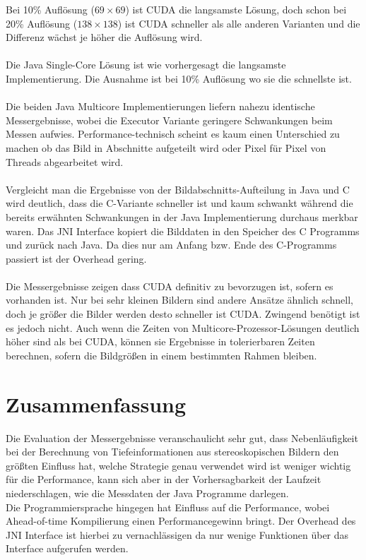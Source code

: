 \documentclass[%
  a4paper,%
  12pt,%
  style=screen, %
  oneside,
  blue,%
  ]{tubsartcl}
\begin{document}
Bei 10\% Auflösung ($69\times69$) ist CUDA die langsamste Lösung, doch schon bei 20\% Auflösung \sloppy ($138\times138$)
ist CUDA schneller als alle anderen Varianten und die Differenz wächst je höher die Auflösung wird.\\
\\
Die Java Single-Core Lösung ist wie vorhergesagt die langsamste Implementierung. Die Ausnahme ist bei 10\% Auflösung wo
sie die schnellste ist. \\
\\
Die beiden Java Multicore Implementierungen liefern nahezu identische Messergebnisse, wobei die Executor Variante
geringere Schwankungen beim Messen aufwies. Performance-technisch scheint es kaum einen Unterschied zu machen ob das
Bild in Abschnitte aufgeteilt wird oder Pixel für Pixel von Threads abgearbeitet wird.\\
\\
Vergleicht man die Ergebnisse von der Bildabschnitts-Aufteilung in Java und C wird deutlich, dass die C-Variante
schneller ist und kaum schwankt während die bereits erwähnten Schwankungen in der Java Implementierung durchaus merkbar
waren. Das JNI Interface kopiert die Bilddaten in den Speicher des C Programms und zurück nach Java. Da dies nur am
Anfang bzw. Ende des C-Programms passiert ist der Overhead gering.\\
\\
Die Messergebnisse zeigen dass CUDA definitiv zu bevorzugen ist, sofern es vorhanden ist. Nur bei sehr kleinen Bildern
sind andere Ansätze ähnlich schnell, doch je größer die Bilder werden desto schneller ist CUDA. Zwingend benötigt ist
es jedoch nicht. Auch wenn die Zeiten von Multicore-Prozessor-Lösungen deutlich höher sind als bei CUDA, können sie
Ergebnisse in tolerierbaren Zeiten berechnen, sofern die Bildgrößen in einem bestimmten Rahmen bleiben.
  
\section{Zusammenfassung}
Die Evaluation der Messergebnisse veranschaulicht sehr gut, dass Nebenläufigkeit bei der Berechnung von
Tiefeinformationen aus stereoskopischen Bildern den größten Einfluss hat, welche Strategie genau verwendet wird ist
weniger wichtig für die Performance, kann sich aber in der Vorhersagbarkeit der Laufzeit niederschlagen, wie die
Messdaten der Java Programme darlegen. \\
Die Programmiersprache hingegen hat Einfluss auf die Performance, wobei
Ahead-of-time Kompilierung einen Performancegewinn bringt. Der Overhead des JNI Interface ist hierbei zu
vernachlässigen da nur wenige Funktionen über das Interface aufgerufen werden.
\end{document}
